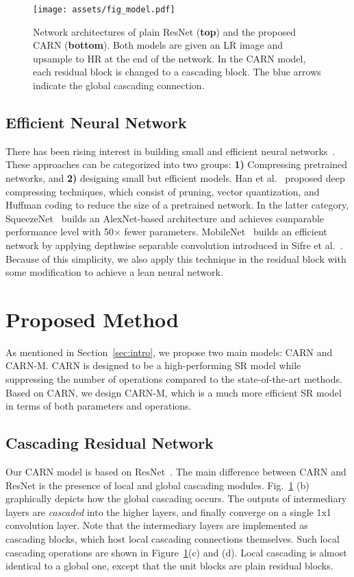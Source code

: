 \documentclass[runningheads]{llncs}
\begin{document}
\begin{figure}[t]
    \centering
    \texttt{[image: assets/fig\_model.pdf]}
    \caption{Network architectures of plain ResNet (\textbf{top}) and the proposed CARN (\textbf{bottom}). Both models are given an LR image and upsample to HR at the end of the network. In the CARN model, each residual block is changed to a cascading block. The blue arrows indicate the global cascading connection.}
    \label{fig:model}
\end{figure}

\subsection{Efficient Neural Network}
\label{subsec:efficient_nn}
There has been rising interest in building small and efficient neural networks~\cite{squeezenet,han2015deep,mobilenets}. These approaches can be categorized into two groups: \textbf{1)} Compressing pretrained networks, and \textbf{2)} designing small but efficient models. Han et al.~\cite{han2015deep} proposed deep compressing techniques, which consist of pruning, vector quantization, and Huffman coding to reduce the size of a pretrained network. In the latter category, SqueezeNet~\cite{squeezenet} builds an AlexNet-based architecture and achieves comparable performance level with 50$\times$ fewer parameters. MobileNet~\cite{mobilenets} builds an efficient network by applying depthwise separable convolution introduced in Sifre et al.~\cite{dwconv}. Because of this simplicity, we also apply this technique in the residual block with some modification to achieve a lean neural network.

\section{Proposed Method}
\label{sec:method}
As mentioned in Section~\ref{sec:intro}, we propose two main models: CARN and CARN-M. CARN is designed to be a high-performing SR model while suppressing the number of operations compared to the state-of-the-art methods. Based on CARN, we design CARN-M, which is a much more efficient SR model in terms of both parameters and operations.

\subsection{Cascading Residual Network}
\label{subsec:carn}
Our CARN model is based on ResNet~\cite{resnet2016}. The main difference between CARN and ResNet is the presence of local and global cascading modules. Fig.~\ref{fig:model} (b) graphically depicts how the global cascading occurs. The outputs of intermediary layers are \textit{cascaded} into the higher layers, and finally converge on a single 1x1 convolution layer. Note that the intermediary layers are implemented as cascading blocks, which host local cascading connections themselves. Such local cascading operations are shown in Figure~\ref{fig:model}(c) and (d). Local cascading is almost identical to a global one, except that the unit blocks are plain residual blocks.
\end{document}
